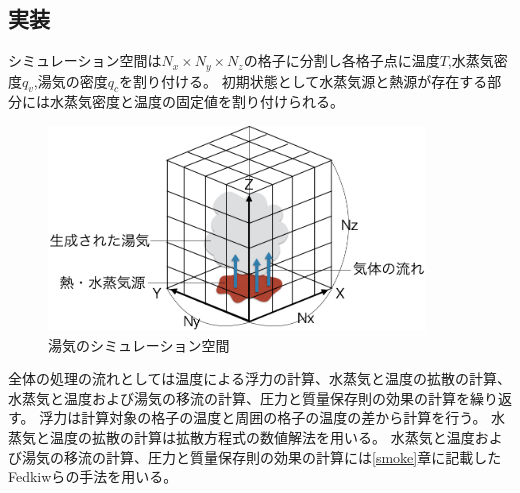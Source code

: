 \subsection{実装}
シミュレーション空間は$N_{x} \times N_{y} \times N_{z}$の格子に分割し各格子点に温度$T$,水蒸気密度$q_{v}$,湯気の密度$q_{c}$を割り付ける。
初期状態として水蒸気源と熱源が存在する部分には水蒸気密度と温度の固定値を割り付けられる。
\begin{figure}
	\begin{center}
		\includegraphics[width=100mm]{simulation.png}
		\caption{湯気のシミュレーション空間}
		\label{simulation}
	\end{center}
\end{figure}
全体の処理の流れとしては温度による浮力の計算、水蒸気と温度の拡散の計算、水蒸気と温度および湯気の移流の計算、圧力と質量保存則の効果の計算を繰り返す。
浮力は計算対象の格子の温度と周囲の格子の温度の差から計算を行う。
水蒸気と温度の拡散の計算は拡散方程式の数値解法を用いる。
水蒸気と温度および湯気の移流の計算、圧力と質量保存則の効果の計算には\ref{smoke}章に記載したFedkiwら\cite{Fedkiw2001}の手法を用いる。



